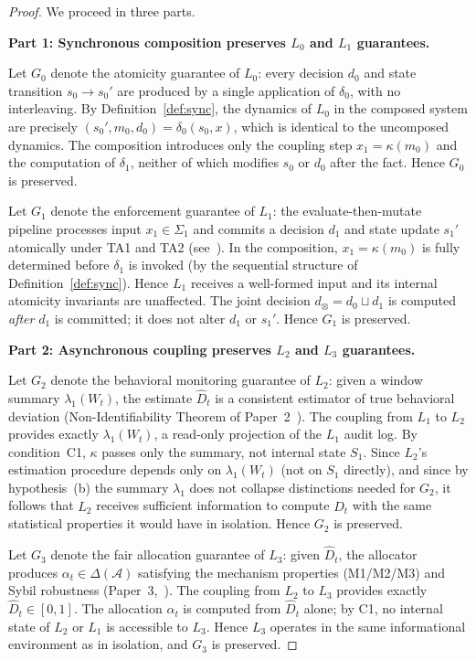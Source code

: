 \documentclass[11pt]{article}
\newcommand{\Agents}{\mathcal{A}}
\newcommand{\Dhat}{\widehat{D}}
\newcommand{\Layer}[1]{L_{#1}}
\newcommand{\State}[1]{S_{#1}}
\newcommand{\Trans}[1]{\delta_{#1}}
\newcommand{\Sum}[1]{\lambda_{#1}}
\newcommand{\join}{\sqcup}
\begin{document}
\begin{proof}
We proceed in three parts.

\medskip
\noindent\textbf{Part 1: Synchronous composition preserves $\Layer{0}$ and
$\Layer{1}$ guarantees.}

Let $G_0$ denote the atomicity guarantee of $\Layer{0}$: every decision
$d_0$ and state transition $s_0 \to s_0'$ are produced by a single
application of $\Trans{0}$, with no interleaving. By
Definition~\ref{def:sync}, the dynamics of $\Layer{0}$ in the composed
system are precisely $(s_0', m_0, d_0) = \Trans{0}(s_0, x)$, which is
identical to the uncomposed dynamics. The composition introduces only the
coupling step $x_1 = \kappa(m_0)$ and the computation of $\Trans{1}$, neither
of which modifies $s_0$ or $d_0$ after the fact. Hence $G_0$ is preserved.

Let $G_1$ denote the enforcement guarantee of $\Layer{1}$: the evaluate-then-mutate
pipeline processes input $x_1 \in \Sigma_1$ and commits a decision $d_1$
and state update $s_1'$ atomically under TA1 and TA2
(see~\cite{fernandez2026b}). In the composition, $x_1 = \kappa(m_0)$ is
fully determined before $\Trans{1}$ is invoked (by the sequential structure
of Definition~\ref{def:sync}). Hence $\Layer{1}$ receives a well-formed input
and its internal atomicity invariants are unaffected. The joint decision
$d_\otimes = d_0 \join d_1$ is computed \emph{after} $d_1$ is committed;
it does not alter $d_1$ or $s_1'$. Hence $G_1$ is preserved.

\medskip
\noindent\textbf{Part 2: Asynchronous coupling preserves $\Layer{2}$ and
$\Layer{3}$ guarantees.}

Let $G_2$ denote the behavioral monitoring guarantee of $\Layer{2}$: given a
window summary $\Sum{1}(W_t)$, the estimate $\Dhat_t$ is a consistent
estimator of true behavioral deviation (Non-Identifiability Theorem of
Paper~2~\cite{fernandez2026c}). The coupling from $\Layer{1}$ to $\Layer{2}$
provides exactly $\Sum{1}(W_t)$, a read-only projection of the $\Layer{1}$
audit log. By condition~C1, $\kappa$ passes only the summary, not internal
state $\State{1}$. Since $\Layer{2}$'s estimation procedure depends only on
$\Sum{1}(W_t)$ (not on $\State{1}$ directly), and since by hypothesis~(b) the
summary $\Sum{1}$ does not collapse distinctions needed for $G_2$, it follows
that $\Layer{2}$ receives sufficient information to compute $\Dhat_t$ with
the same statistical properties it would have in isolation. Hence $G_2$ is
preserved.

Let $G_3$ denote the fair allocation guarantee of $\Layer{3}$: given $\Dhat_t$,
the allocator produces $\alpha_t \in \Delta(\Agents)$ satisfying the mechanism
properties (M1/M2/M3) and Sybil robustness (Paper~3,~\cite{fairgov26}). The
coupling from $\Layer{2}$ to $\Layer{3}$ provides exactly $\Dhat_t \in [0,1]$.
The allocation $\alpha_t$ is computed from $\Dhat_t$ alone; by C1, no internal
state of $\Layer{2}$ or $\Layer{1}$ is accessible to $\Layer{3}$. Hence
$\Layer{3}$ operates in the same informational environment as in isolation,
and $G_3$ is preserved.


\end{proof}
\end{document}
